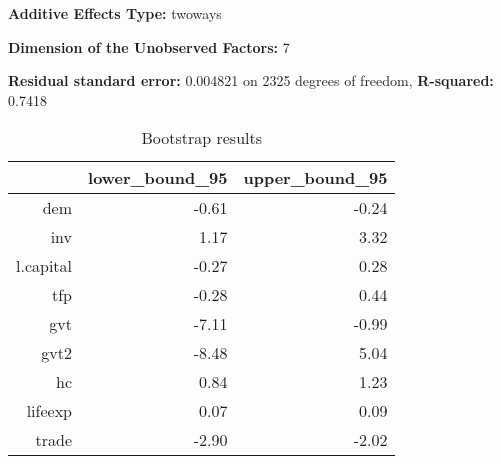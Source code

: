 \textbf{Additive Effects Type:} twoways

\textbf{Dimension of the Unobserved Factors:} 7

\textbf{Residual standard error:} 0.004821 on 2325 degrees of freedom, \textbf{R-squared:} 0.7418





\begin{table}[ht]
\centering
\caption{Bootstrap results} 
\begin{tabular}{rrr}
  \hline 
 & lower\_bound\_95 & upper\_bound\_95 \\ 
  \hline 
dem & -0.61 & -0.24 \\ 
  inv & 1.17 & 3.32 \\ 
  l.capital & -0.27 & 0.28 \\ 
  tfp & -0.28 & 0.44 \\ 
  gvt & -7.11 & -0.99 \\ 
  gvt2 & -8.48 & 5.04 \\ 
  hc & 0.84 & 1.23 \\ 
  lifeexp & 0.07 & 0.09 \\ 
  trade & -2.90 & -2.02 \\ 
   \hline 
\end{tabular}
\end{table}





 
